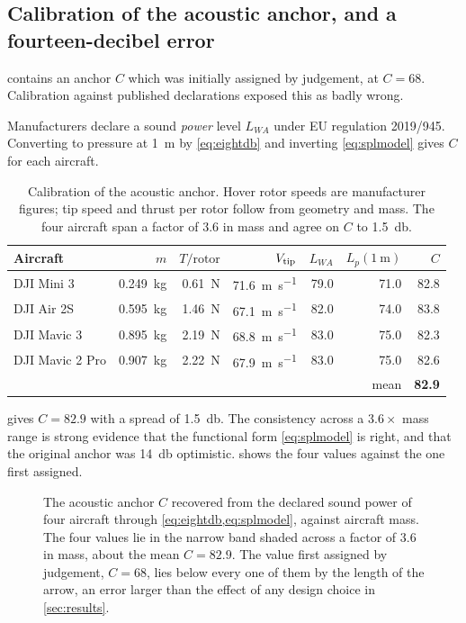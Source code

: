 \subsection{Calibration of the acoustic anchor, and a fourteen-decibel error}

 contains an anchor $C$ which was initially assigned by
judgement, at $C=68$. Calibration against published declarations exposed this
as badly wrong.

Manufacturers declare a sound \emph{power} level $L_{WA}$ under EU regulation
2019/945. Converting to pressure at \SI{1}{\metre} by \cref{eq:eightdb} and
inverting \cref{eq:splmodel} gives $C$ for each aircraft.

\begin{table}[t]
\centering
\caption{Calibration of the acoustic anchor. Hover rotor speeds are
manufacturer figures; tip speed and thrust per rotor follow from geometry and
mass. The four aircraft span a factor of $3.6$ in mass and agree on $C$ to
\SI{1.5}{\decibel}.}
\label{tab:acoustic}
\begin{tabular}{@{}lrrrrrr@{}}
\toprule
Aircraft & $m$ & $T/\text{rotor}$ & $V_{\mathrm{tip}}$ & $L_{WA}$ & $L_p(\SI{1}{\metre})$ & $C$ \\
\midrule
DJI Mini 3      & \SI{0.249}{\kilo\gram} & \SI{0.61}{\newton} & \SI{71.6}{\metre\per\second} & 79.0 & 71.0 & 82.8 \\
DJI Air 2S      & \SI{0.595}{\kilo\gram} & \SI{1.46}{\newton} & \SI{67.1}{\metre\per\second} & 82.0 & 74.0 & 83.8 \\
DJI Mavic 3     & \SI{0.895}{\kilo\gram} & \SI{2.19}{\newton} & \SI{68.8}{\metre\per\second} & 83.0 & 75.0 & 82.3 \\
DJI Mavic 2 Pro & \SI{0.907}{\kilo\gram} & \SI{2.22}{\newton} & \SI{67.9}{\metre\per\second} & 83.0 & 75.0 & 82.6 \\
\midrule
\multicolumn{6}{r}{mean} & \textbf{82.9} \\
\bottomrule
\end{tabular}
\end{table}

 gives $C = 82.9$ with a spread of \SI{1.5}{\decibel}. The
consistency across a $3.6\times$ mass range is strong evidence that the
functional form \cref{eq:splmodel} is right, and that the original anchor was
\SI{14}{\decibel} optimistic.  shows the four values against
the one first assigned.

\begin{figure}[tbp]
\centering

\caption{The acoustic anchor $C$ recovered from the declared sound power of
four aircraft through \cref{eq:eightdb,eq:splmodel}, against aircraft mass.
The four values lie in the narrow band shaded across a factor of $3.6$ in
mass, about the mean $C=82.9$. The value first assigned by judgement, $C=68$,
lies below every one of them by the length of the arrow, an error larger than
the effect of any design choice in \cref{sec:results}.}
\label{fig:acoustic}
\end{figure}

